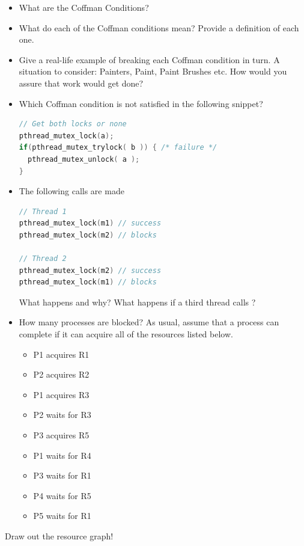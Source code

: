 \begin{itemize}
\item
  What are the Coffman Conditions?
\item
  What do each of the Coffman conditions mean? Provide a definition of each one.
\item
  Give a real-life example of breaking each Coffman condition in turn. A situation to consider: Painters, Paint, Paint Brushes etc. How would you assure that work would get done?
\item
  Which Coffman condition is not satisfied in the following snippet?

\begin{lstlisting}[language=C]
// Get both locks or none
pthread_mutex_lock(a);
if(pthread_mutex_trylock( b )) { /* failure */
  pthread_mutex_unlock( a );
}
\end{lstlisting}
\item
  The following calls are made

\begin{lstlisting}[language=c]
// Thread 1
pthread_mutex_lock(m1) // success
pthread_mutex_lock(m2) // blocks

// Thread 2
pthread_mutex_lock(m2) // success
pthread_mutex_lock(m1) // blocks
\end{lstlisting}

  What happens and why? What happens if a third thread calls
   ?
\item
  How many processes are blocked? As usual, assume that a process can complete if it can acquire all of the resources listed
  below.

  \begin{itemize}
  \tightlist
  \item
    P1 acquires R1
  \item
    P2 acquires R2
  \item
    P1 acquires R3
  \item
    P2 waits for R3
  \item
    P3 acquires R5
  \item
    P1 waits for R4
  \item
    P3 waits for R1
  \item
    P4 waits for R5
  \item
    P5 waits for R1
  \end{itemize}
\end{itemize}

Draw out the resource graph!



